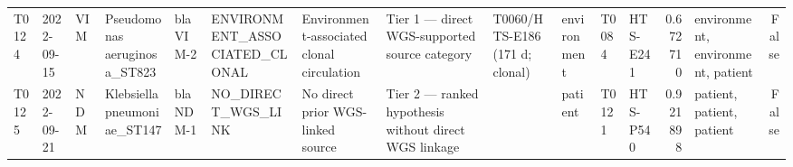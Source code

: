 \begin{tabular}{llllllllllllrlr}
T0124 & 2022-09-15 & VIM & Pseudomonas aeruginosa\_ST823 & blaVIM-2 & ENVIRONMENT\_ASSOCIATED\_CLONAL & Environment-associated clonal circulation & Tier 1 — direct WGS-supported source category & T0060/HTS-E186 (171 d; clonal) & environment & T0084 & HTS-E241 & 0.672710 & environment, environment, patient & False \\
T0125 & 2022-09-21 & NDM & Klebsiella pneumoniae\_ST147 & blaNDM-1 & NO\_DIRECT\_WGS\_LINK & No direct prior WGS-linked source & Tier 2 — ranked hypothesis without direct WGS linkage &  & patient & T0121 & HTS-P540 & 0.921898 & patient, patient, patient & False \\
\bottomrule
\end{tabular}
